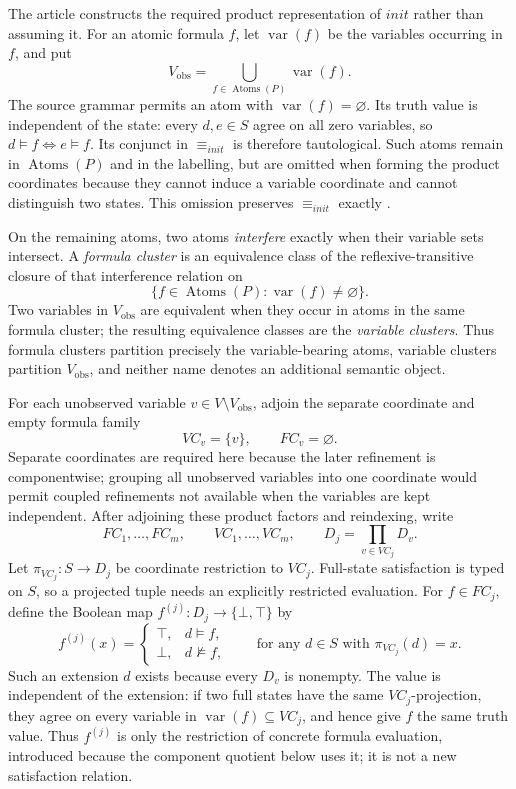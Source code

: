 The article constructs the required product representation of \(init\) rather
than assuming it.  For an atomic formula \(f\), let
\(\operatorname{var}(f)\) be the variables occurring in \(f\), and put
\[
 V_{\mathrm{obs}}
   =\bigcup_{f\in\operatorname{Atoms}(P)}\operatorname{var}(f).
\]
The source grammar permits an atom with
\(\operatorname{var}(f)=\varnothing\).  Its truth value is independent of the
state: every \(d,e\in S\) agree on all zero variables, so
\(d\models f\iff e\models f\).  Its conjunct in \(\equiv_{init}\) is therefore
tautological.  Such atoms remain in \(\operatorname{Atoms}(P)\) and in the
labelling, but are omitted when forming the product coordinates because they
cannot induce a variable coordinate and cannot distinguish two states.
This omission preserves \(\equiv_{init}\) exactly
\cite[\S4.2.1, p.~767; \S4.2.3, p.~770]{ClarkeEtAl2003}.

On the remaining atoms, two atoms \emph{interfere} exactly when their variable
sets intersect.  A \emph{formula cluster} is an equivalence class of the
reflexive-transitive closure of that interference relation on
\[
 \{f\in\operatorname{Atoms}(P):
     \operatorname{var}(f)\ne\varnothing\}.
\]
Two
variables in \(V_{\mathrm{obs}}\) are equivalent when they occur in atoms in
the same formula cluster; the resulting equivalence classes are the
\emph{variable clusters}.  Thus formula clusters partition precisely the
variable-bearing atoms, variable clusters partition \(V_{\mathrm{obs}}\), and
neither name denotes an additional semantic object.

For each unobserved variable \(v\in V\setminus V_{\mathrm{obs}}\), adjoin the
separate coordinate and empty formula family
\[
 VC_v=\{v\},
 \qquad
 FC_v=\varnothing.
\]
Separate coordinates are required here because the later refinement is
componentwise; grouping all unobserved variables into one coordinate would
permit coupled refinements not available when the variables are kept
independent. After adjoining these product factors and reindexing, write
\[
 FC_1,\ldots,FC_m,\qquad
 VC_1,\ldots,VC_m,\qquad
 D_j=\prod_{v\in VC_j}D_v.
\]
Let \(\pi_{VC_j}:S\to D_j\) be coordinate restriction to \(VC_j\).  Full-state
satisfaction is typed on \(S\), so a projected tuple needs an explicitly
restricted evaluation.  For \(f\in FC_j\), define the Boolean map
\(f^{(j)}:D_j\to\{\bot,\top\}\) by
\[
 f^{(j)}(x)=
 \begin{cases}
  \top,&d\models f,\\
  \bot,&d\not\models f,
 \end{cases}
 \qquad
 \text{for any }d\in S\text{ with }\pi_{VC_j}(d)=x.
\]
Such an extension \(d\) exists because every \(D_v\) is nonempty.  The value
is independent of the extension: if two full states have the same
\(VC_j\)-projection, they agree on every variable in
\(\operatorname{var}(f)\subseteq VC_j\), and hence give \(f\) the same truth
value.  Thus \(f^{(j)}\) is only the restriction of concrete formula
evaluation, introduced because the component quotient below uses it; it is not
a new satisfaction relation.

